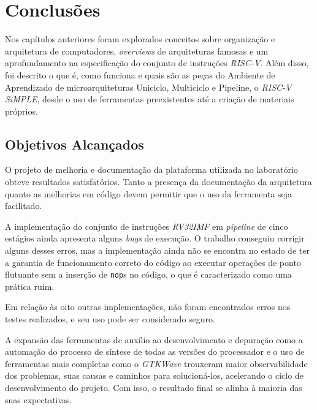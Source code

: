\chapter{Conclusões}\label{cap5_conclusoes}

{ Nos capítulos anteriores foram explorados conceitos sobre organização e arquitetura
    de computadores, \textit{overviews} de arquiteturas famosas e um aprofundamento
    na especificação do conjunto de instruções \textit{RISC-V}. Além disso, foi
    descrito o que é, como funciona e quais são as peças do Ambiente de Aprendizado
    de microarquiteturas Uniciclo, Multiciclo e Pipeline, o \textit{RISC-V SiMPLE},
    desde o uso de ferramentas preexistentes até a criação de materiais próprios.
}


\section{Objetivos Alcançados}
    { O projeto de melhoria e documentação da plataforma utilizada no laboratório
        obteve resultados satisfatórios. Tanto a presença da documentação da
        arquitetura quanto as melhorias em código devem permitir que o uso da
        ferramenta seja facilitado.
    }

    { A implementação do conjunto de instruções \textit{RV32IMF} em \textit{pipeline}
        de cinco estágios ainda apresenta alguns \textit{bugs} de execução.
        O trabalho conseguiu corrigir alguns desses erros, mas a implementação
        ainda não se encontra no estado de ter a garantia de funcionamento correto
        do código ao executar operações de ponto flutuante sem a inserção de
        \texttt{nop}s no código, o que é caracterizado como uma prática ruim.
    }

    { Em relação às oito outras implementações, não foram encontrados erros nos
        testes realizados, e seu uso pode ser considerado seguro.
    }

    { A expansão das ferramentas de auxílio ao desenvolvimento e depuração como
        a automação do processo de síntese de todas as versões do processador e
        o uso de ferramentas mais completas como o \textit{GTKWave} trouxeram
        maior observabilidade dos problemas, suas causas e caminhos para solucioná-los,
        acelerando o ciclo de desenvolvimento do projeto. Com isso, o resultado
        final se alinha à maioria das suas expectativas.
    }

\clearpage
